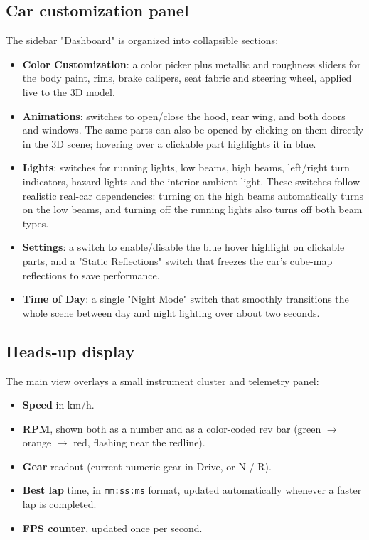 \documentclass[11pt]{article}
\begin{document}
\subsection{Car customization panel}
The sidebar "Dashboard" is organized into collapsible sections:
\begin{itemize}
    \item \textbf{Color Customization}: a color picker plus metallic and
    roughness sliders for the body paint, rims, brake calipers, seat fabric
    and steering wheel, applied live to the 3D model.
    \item \textbf{Animations}: switches to open/close the hood, rear wing,
    and both doors and windows. The same parts can also be opened by
    clicking on them directly in the 3D scene; hovering over a clickable
    part highlights it in blue.
    \item \textbf{Lights}: switches for running lights, low beams, high
    beams, left/right turn indicators, hazard lights and the interior
    ambient light. These switches follow realistic real-car dependencies:
    turning on the high beams automatically turns on the low beams, and
    turning off the running lights also turns off both beam types.
    \item \textbf{Settings}: a switch to enable/disable the blue hover
    highlight on clickable parts, and a "Static Reflections" switch that
    freezes the car's cube-map reflections to save performance.
    \item \textbf{Time of Day}: a single "Night Mode" switch that smoothly
    transitions the whole scene between day and night lighting over about
    two seconds.
\end{itemize}

\subsection{Heads-up display}
The main view overlays a small instrument cluster and telemetry panel:
\begin{itemize}
    \item \textbf{Speed} in km/h.
    \item \textbf{RPM}, shown both as a number and as a color-coded rev
    bar (green $\rightarrow$ orange $\rightarrow$ red, flashing near the
    redline).
    \item \textbf{Gear} readout (current numeric gear in Drive, or N / R).
    \item \textbf{Best lap} time, in \texttt{mm:ss:ms} format, updated
    automatically whenever a faster lap is completed.
    \item \textbf{FPS counter}, updated once per second.
\end{itemize}
\end{document}
